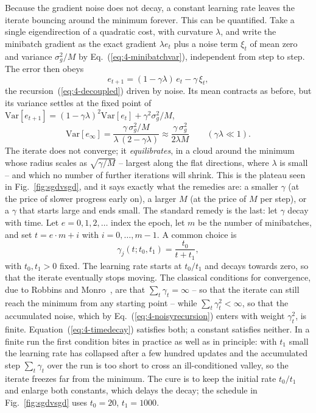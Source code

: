 Because the gradient noise does not decay, a constant learning rate leaves the
iterate bouncing around the minimum forever.  This can be quantified.  Take
a single eigendirection of a quadratic cost, with curvature $\lambda$, and
write the minibatch gradient as the exact gradient $\lambda e_t$ plus a noise
term $\xi_t$ of mean zero and variance $\sigma_g^{2}/M$ by
Eq.~(\ref{eq:4-minibatchvar}), independent from step to step.  The error
then obeys
\begin{equation}
  e_{t+1}=(1-\gamma\lambda)\,e_t-\gamma\,\xi_t ,
  \label{eq:4-noisyrecursion}
\end{equation}
the recursion~(\ref{eq:4-decoupled}) driven by noise.  Its mean contracts as
before, but its variance settles at the fixed point of
$\mathrm{Var}[e_{t+1}]=(1-\gamma\lambda)^{2}\mathrm{Var}[e_t]+\gamma^{2}\sigma_g^{2}/M$,
\begin{equation}
  \mathrm{Var}[e_\infty]=\frac{\gamma\,\sigma_g^{2}/M}{\lambda\,(2-\gamma\lambda)}
  \approx\frac{\gamma\,\sigma_g^{2}}{2\lambda M}
  \qquad(\gamma\lambda\ll1).
  \label{eq:4-sgdcloud}
\end{equation}
The iterate does not converge; it \emph{equilibrates}, in a cloud around the
minimum whose radius scales as $\sqrt{\gamma/M}$ -- largest along the flat
directions, where $\lambda$ is small -- and which no number of further
iterations will shrink.  This is the plateau seen in
Fig.~\ref{fig:sgdvsgd}, and it says exactly what the remedies are: a smaller
$\gamma$ (at the price of slower progress early on), a larger $M$ (at the
price of $M$ per step), or a $\gamma$ that starts large and ends small.  The
standard remedy is the last: let $\gamma$ decay with time.  Let $e=0,1,2,\dots$ index the epoch, let $m$ be the
number of minibatches, and set $t=e\cdot m+i$ with $i=0,\dots,m-1$.  A common
choice is
\begin{equation}
  \gamma_j(t;t_0,t_1) = \frac{t_0}{t+t_1},
  \label{eq:4-timedecay}
\end{equation}
with $t_0,t_1>0$ fixed.  The learning rate starts at $t_0/t_1$ and decays
towards zero, so that the iterate eventually stops moving.  The classical
conditions for convergence, due to Robbins and Monro~\cite{robbins1951}, are
that $\sum_t\gamma_t=\infty$ -- so that the iterate can still reach the
minimum from any starting point -- while $\sum_t\gamma_t^{2}<\infty$, so that
the accumulated noise, which by Eq.~(\ref{eq:4-noisyrecursion}) enters with
weight $\gamma_t^{2}$, is finite.  Equation~(\ref{eq:4-timedecay}) satisfies
both; a constant satisfies neither.  In a finite run the first condition
bites in practice as well as in principle: with $t_1$ small the learning rate
has collapsed after a few hundred updates and the accumulated step
$\sum_t\gamma_t$ over the run is too short to cross an ill-conditioned
valley, so the iterate freezes far from the minimum.  The cure is to keep
the initial rate $t_0/t_1$ and enlarge both constants, which delays the
decay; the schedule in Fig.~\ref{fig:sgdvsgd} uses $t_0=20$, $t_1=1000$.

